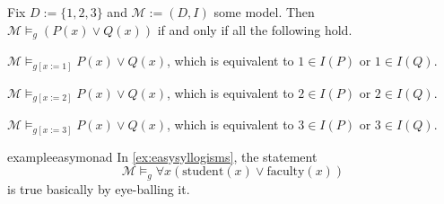 \begin{example}
	Fix $D:=\{1,2,3\}$ and $\mathcal M:=(D,I)$ some model. Then $\mathcal M\models_g(P(x)\lor Q(x))$ if and only if all the following hold.
	\begin{listroman}
		\item $\mathcal M\models_{g[x:=1]}P(x)\lor Q(x)$, which is equivalent to $1\in I(P)$ or $1\in I(Q)$.
		\item $\mathcal M\models_{g[x:=2]}P(x)\lor Q(x)$, which is equivalent to $2\in I(P)$ or $2\in I(Q)$.
		\item $\mathcal M\models_{g[x:=3]}P(x)\lor Q(x)$, which is equivalent to $3\in I(P)$ or $3\in I(Q)$.
	\end{listroman}
\end{example}
\begin{restatable}{example}{easymonad}
	In \autoref{ex:easysyllogisms}, the statement
	\[\mathcal M\models_g\forall x(\mathrm{student}(x)\lor\mathrm{faculty}(x))\]
	is true basically by eye-balling it.
\end{restatable}